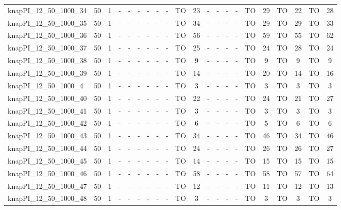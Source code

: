 \begin{sidewaystable}[!ht]
{\begin{tabular}{lcccccccccccccccccccc}
knapPI\_12\_50\_1000\_34 & 50 & 1 &  - &  - &  - &  - &  - &  - & TO & 23 &  - &  - &  - &  - & TO & 29 & TO & 22 & TO & 28 \\
knapPI\_12\_50\_1000\_35 & 50 & 1 &  - &  - &  - &  - &  - &  - & TO & 34 &  - &  - &  - &  - & TO & 29 & TO & 29 & TO & 33 \\
knapPI\_12\_50\_1000\_36 & 50 & 1 &  - &  - &  - &  - &  - &  - & TO & 56 &  - &  - &  - &  - & TO & 59 & TO & 55 & TO & 62 \\
knapPI\_12\_50\_1000\_37 & 50 & 1 &  - &  - &  - &  - &  - &  - & TO & 25 &  - &  - &  - &  - & TO & 24 & TO & 28 & TO & 24 \\
knapPI\_12\_50\_1000\_38 & 50 & 1 &  - &  - &  - &  - &  - &  - & TO & 9 &  - &  - &  - &  - & TO & 9 & TO & 9 & TO & 9 \\
knapPI\_12\_50\_1000\_39 & 50 & 1 &  - &  - &  - &  - &  - &  - & TO & 14 &  - &  - &  - &  - & TO & 20 & TO & 14 & TO & 16 \\
knapPI\_12\_50\_1000\_4 & 50 & 1 &  - &  - &  - &  - &  - &  - & TO & 3 &  - &  - &  - &  - & TO & 3 & TO & 3 & TO & 3 \\
knapPI\_12\_50\_1000\_40 & 50 & 1 &  - &  - &  - &  - &  - &  - & TO & 22 &  - &  - &  - &  - & TO & 24 & TO & 21 & TO & 27 \\
knapPI\_12\_50\_1000\_41 & 50 & 1 &  - &  - &  - &  - &  - &  - & TO & 3 &  - &  - &  - &  - & TO & 3 & TO & 3 & TO & 3 \\
knapPI\_12\_50\_1000\_42 & 50 & 1 &  - &  - &  - &  - &  - &  - & TO & 6 &  - &  - &  - &  - & TO & 5 & TO & 6 & TO & 6 \\
knapPI\_12\_50\_1000\_43 & 50 & 1 &  - &  - &  - &  - &  - &  - & TO & 34 &  - &  - &  - &  - & TO & 46 & TO & 34 & TO & 46 \\
knapPI\_12\_50\_1000\_44 & 50 & 1 &  - &  - &  - &  - &  - &  - & TO & 24 &  - &  - &  - &  - & TO & 26 & TO & 26 & TO & 27 \\
knapPI\_12\_50\_1000\_45 & 50 & 1 &  - &  - &  - &  - &  - &  - & TO & 14 &  - &  - &  - &  - & TO & 15 & TO & 15 & TO & 15 \\
knapPI\_12\_50\_1000\_46 & 50 & 1 &  - &  - &  - &  - &  - &  - & TO & 58 &  - &  - &  - &  - & TO & 58 & TO & 57 & TO & 64 \\
knapPI\_12\_50\_1000\_47 & 50 & 1 &  - &  - &  - &  - &  - &  - & TO & 12 &  - &  - &  - &  - & TO & 11 & TO & 12 & TO & 13 \\
knapPI\_12\_50\_1000\_48 & 50 & 1 &  - &  - &  - &  - &  - &  - & TO & 3 &  - &  - &  - &  - & TO & 3 & TO & 3 & TO & 3 \\

\end{tabular}}
\end{sidewaystable}
